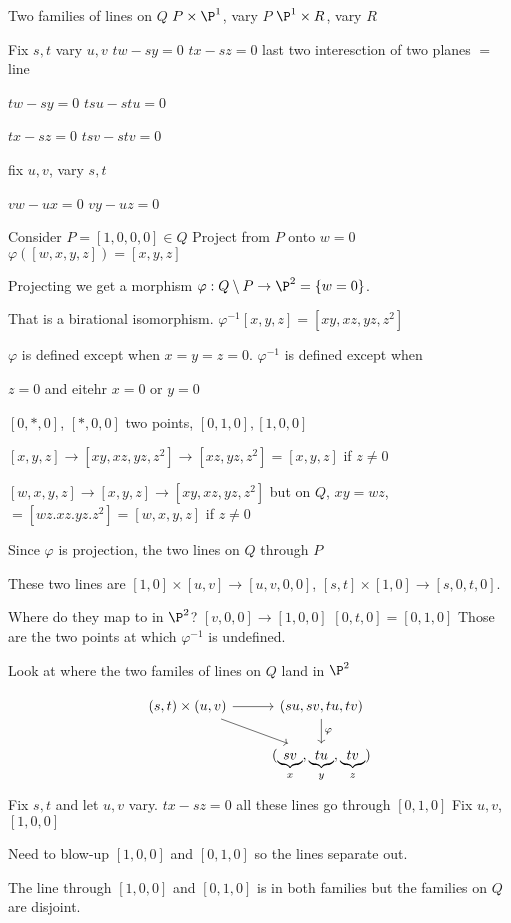 Two families of lines on $Q$
$P \times \P^1$, vary $P$
$\P^1 \times R$, vary $R$


Fix $s,t$ vary $u,v$
$tw-sy=0$
$tx-sz=0$
last two interesction of two planes $=$ line

$tw-sy=0$
$tsu-stu=0$

$tx-sz=0$
$tsv-stv=0$


fix $u,v$, vary $s,t$

$vw-ux=0$
$vy-uz=0$

Consider $P= [1,0,0,0] \in Q$
Project from $P$ onto $w=0$
$\varphi([w,x,y,z])= [x,y,z]$

Projecting we get a morphism $\varphi: Q \setminus P \to \P^2 = \{w=0\}$. 

That is a birational isomorphism. 
$\varphi^{-1}[x,y,z]= [xy,xz,yz,z^2]$

$\varphi$ is defined except when $x=y=z=0$. 
$\varphi^{-1}$ is defined except when 

$z=0$ and eitehr $x=0$ or $y=0$

$[0,*,0]$, $[*,0,0]$
two points, $[0,1,0], [1,0,0]$

$[x,y,z] \to [xy,xz,yz,z^2] \to [xz,yz,z^2]= [x,y,z]$ if $z \neq 0$

$[w,x,y,z] \to [x,y,z] \to [xy,xz,yz,z^2]$ but on $Q$, $xy=wz$, $=[wz.xz.yz.z^2]=[w,x,y,z]$ if $z \neq 0$

Since $\varphi$ is projection, the two lines on $Q$ through $P$

These two lines are $[1,0] \times [u,v] \to [u,v,0,0]$, $[s,t] \times [1,0] \to [s,0,t,0]$.

Where do they map to in $\P^2$?
$[v,0,0] \to [1,0,0]$
$[0,t,0]= [0,1,0]$
Those are the two points at which $\varphi^{-1}$ is undefined. 

Look at where the two familes of lines on $Q$ land in $\P^2$


	\[
	\begin{tikzcd}
	(s,t) \times (u,v) \arrow{r} \arrow{rd} & (su,sv,tu,tv) \arrow{d}{\varphi} \\ 
	& (\underbrace{sv}_{x},\underbrace{tu}_{y},\underbrace{tv}_{z})
	\end{tikzcd}
	\]
Fix $s,t$ and let $u,v$ vary. $tx-sz=0$ all these lines go through $[0,1,0]$
Fix $u,v$, $[1,0,0]$

 
 Need to blow-up
 $[1,0,0]$ and $[0,1,0]$
 so the lines separate out.
 
 The line through $[1,0,0]$ and $[0,1,0]$ is in both families but the families on $Q$ are disjoint.
 
